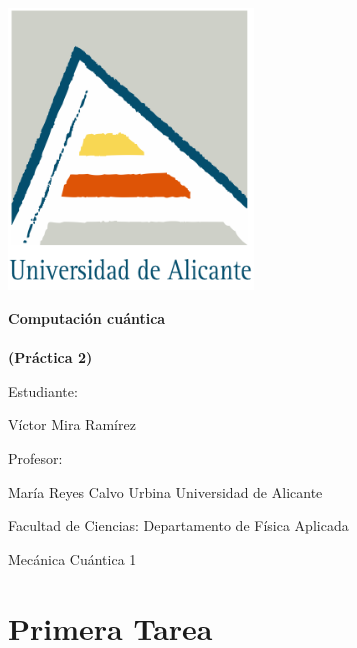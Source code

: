 \documentclass[11pt]{article}
\newcommand{\titulo}{Computación cuántica\\\ \\(Práctica 2)}
\newcommand{\nombreestudiante}{Víctor Mira Ramírez}
\newcommand{\nombredirector}{María Reyes Calvo Urbina}
\newcommand{\fecha}{\date{Junio 2023}}  %
\begin{document}
\begin{titlepage}
	\centering
	\includegraphics[width=65mm]{fotos/logoUA.png}\par
	\vspace{1cm}
	{\huge\bfseries \vspace{15mm} \titulo \par}
	\vfill
	{\large 
	\vfill
	Estudiante:\par\vspace{2mm}
	\nombreestudiante\par
	\vfill
	Profesor:\par\vspace{2mm}
    \nombredirector
    \vfill
    Universidad de Alicante\par
    Facultad de Ciencias: Departamento de Física Aplicada\par
    Mecánica Cuántica 1\par
	\fecha\par}
\end{titlepage}

\pagebreak

\begin{abstract}\label{sec:abstract}
    \noindent El objetivo de esta práctica es el cálculo y representación visual de campos eléctricos debidos a distribuciones de cargas puntuales y distribuciones continuas. Para ello emplearemos dos métodos: mediante la superposición de los campos eléctricos debidos a cargas puntuales y mediante la resolución de forma numérica de la ecuación de Poisson.
\end{abstract}

\vspace{0.3cm}
\tableofcontents
\newpage
  
\section{Primera Tarea}
\end{document}
